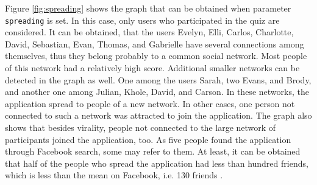 \documentclass[preprint,12pt]{elsarticle}
\begin{document}
Figure \ref{fig:spreading} shows the graph that can be obtained when
parameter \verb|spreading| is set. In this case, only users who
participated in the quiz are considered. It can be obtained, that the
users Evelyn, Elli, Carlos, Charlotte, David, Sebastian,
Evan, Thomas, and Gabrielle have several connections among themselves,
thus they belong probably to a common social network. Most people of this
network had a relatively high score. 
Additional smaller networks can be detected in the graph as well. One among the users Sarah, two Evans,
and Brody, and another one among Julian, Khole, David, and Carson. In
these networks, the application spread to people of a new network. In
other cases, one person not connected to such a network was attracted
to join the application. The graph also shows that besides virality,
people not connected to the large network of participants joined the
application, too. As five people found the application through
Facebook search, some may refer to them.
At least, it can be obtained that half of the people who spread the application
had less than hundred friends, which is less than the mean on
Facebook, i.e. 130 friends \cite{facebookStats}.





\end{document}

